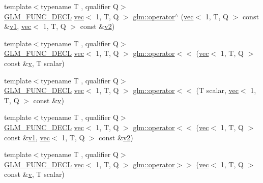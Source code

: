 \begin{DoxyCompactItemize}
\item 
{\footnotesize template$<$typename T , qualifier Q$>$ }\\\mbox{\hyperlink{setup_8hpp_ab2d052de21a70539923e9bcbf6e83a51}{G\+L\+M\+\_\+\+F\+U\+N\+C\+\_\+\+D\+E\+CL}} \mbox{\hyperlink{structglm_1_1vec}{vec}}$<$ 1, T, Q $>$ \mbox{\hyperlink{group__ext__vec1_gaf70fee42d06c335b281793ffc5864b3e}{glm\+::operator$^\wedge$}} (\mbox{\hyperlink{structglm_1_1vec}{vec}}$<$ 1, T, Q $>$ const \&\mbox{\hyperlink{_s_d_l__opengl__glext_8h_a435c176a02c061b43e19bdf7c86cceae}{v1}}, \mbox{\hyperlink{structglm_1_1vec}{vec}}$<$ 1, T, Q $>$ const \&\mbox{\hyperlink{_s_d_l__opengl__glext_8h_a0928f6d0f0f794ba000a21dfae422136}{v2}})
\item 
{\footnotesize template$<$typename T , qualifier Q$>$ }\\\mbox{\hyperlink{setup_8hpp_ab2d052de21a70539923e9bcbf6e83a51}{G\+L\+M\+\_\+\+F\+U\+N\+C\+\_\+\+D\+E\+CL}} \mbox{\hyperlink{structglm_1_1vec}{vec}}$<$ 1, T, Q $>$ \mbox{\hyperlink{group__ext__vec1_gad0e63491d035c65d38f24bd45d2e19d3}{glm\+::operator$<$$<$}} (\mbox{\hyperlink{structglm_1_1vec}{vec}}$<$ 1, T, Q $>$ const \&\mbox{\hyperlink{_s_d_l__opengl_8h_a10a82eabcb59d2fcd74acee063775f90}{v}}, T scalar)
\item 
{\footnotesize template$<$typename T , qualifier Q$>$ }\\\mbox{\hyperlink{setup_8hpp_ab2d052de21a70539923e9bcbf6e83a51}{G\+L\+M\+\_\+\+F\+U\+N\+C\+\_\+\+D\+E\+CL}} \mbox{\hyperlink{structglm_1_1vec}{vec}}$<$ 1, T, Q $>$ \mbox{\hyperlink{group__ext__vec1_gad8117a2c6f59f08e76561309bcdffd1a}{glm\+::operator$<$$<$}} (T scalar, \mbox{\hyperlink{structglm_1_1vec}{vec}}$<$ 1, T, Q $>$ const \&\mbox{\hyperlink{_s_d_l__opengl_8h_a10a82eabcb59d2fcd74acee063775f90}{v}})
\item 
{\footnotesize template$<$typename T , qualifier Q$>$ }\\\mbox{\hyperlink{setup_8hpp_ab2d052de21a70539923e9bcbf6e83a51}{G\+L\+M\+\_\+\+F\+U\+N\+C\+\_\+\+D\+E\+CL}} \mbox{\hyperlink{structglm_1_1vec}{vec}}$<$ 1, T, Q $>$ \mbox{\hyperlink{group__ext__vec1_gad8eac20444d6f266c9b23a6a05e75a5a}{glm\+::operator$<$$<$}} (\mbox{\hyperlink{structglm_1_1vec}{vec}}$<$ 1, T, Q $>$ const \&\mbox{\hyperlink{_s_d_l__opengl__glext_8h_a435c176a02c061b43e19bdf7c86cceae}{v1}}, \mbox{\hyperlink{structglm_1_1vec}{vec}}$<$ 1, T, Q $>$ const \&\mbox{\hyperlink{_s_d_l__opengl__glext_8h_a0928f6d0f0f794ba000a21dfae422136}{v2}})
\item 
{\footnotesize template$<$typename T , qualifier Q$>$ }\\\mbox{\hyperlink{setup_8hpp_ab2d052de21a70539923e9bcbf6e83a51}{G\+L\+M\+\_\+\+F\+U\+N\+C\+\_\+\+D\+E\+CL}} \mbox{\hyperlink{structglm_1_1vec}{vec}}$<$ 1, T, Q $>$ \mbox{\hyperlink{group__ext__vec1_ga4fbe19c5f5fba90c89934a540de87bc5}{glm\+::operator$>$$>$}} (\mbox{\hyperlink{structglm_1_1vec}{vec}}$<$ 1, T, Q $>$ const \&\mbox{\hyperlink{_s_d_l__opengl_8h_a10a82eabcb59d2fcd74acee063775f90}{v}}, T scalar)

\end{DoxyCompactItemize}
